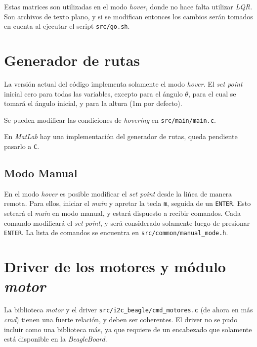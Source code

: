 \documentclass[main]{subfiles}
\begin{document}
Estas matrices son utilizadas en el modo \textit{hover}, donde no hace falta utilizar \textit{LQR}. Son archivos de texto plano, y si se modifican entonces los cambios ser\'an tomados en cuenta al ejecutar el script \verb+src/go.sh+.

\section{Generador de rutas}
\label{sec:software:generador-de-rutas}

La versi\'on actual del c\'odigo implementa solamente el modo \textit{hover}. El \textit{set point} inicial cero para todas las variables, excepto para el \'angulo $\theta$, para el cual se tomar\'a el \'angulo inicial, y para la altura (1m por defecto).

Se pueden modificar las condiciones de \textit{hovering} en \verb+src/main/main.c+.

En \textit{MatLab} hay una implementaci\'on del generador de rutas, queda pendiente pasarlo a \verb+C+.

\subsection{Modo Manual}
\label{sec:software:modo-manual}

En el modo \textit{hover} es posible modificar el \textit{set point} desde la li\'nea de manera remota. Para ellos, iniciar el \textit{main} y apretar la tecla \verb+m+, seguida de un \verb+ENTER+. Esto setear\'a el \textit{main} en modo manual, y estar\'a dispuesto a recibir comandos. Cada comando modificar\'a el \textit{set point}, y ser\'a considerado solamente luego de presionar \verb+ENTER+. La lista de comandos se encuentra en \verb+src/common/manual_mode.h+.

\section{Driver de los motores y m\'odulo \textit{motor}}
\label{sec:software:cmd-motor}

La biblioteca \textit{motor} y el driver \verb+src/i2c_beagle/cmd_motores.c+ (de ahora en m\'as \textit{cmd}) tienen una fuerte relaci\'on, y deben ser coherentes. El driver no se pudo incluir como una biblioteca m\'as, ya que requiere de un encabezado que solamente est\'a disponible en la \textit{BeagleBoard}.
\end{document}
